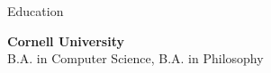 
\begin{rSection}{Education}

	{\bf \large{Cornell University}} \hfill \color{darkgray}{2021 - 2025}
	\\ 
	B.A. in Computer Science, B.A. in Philosophy

\end{rSection}